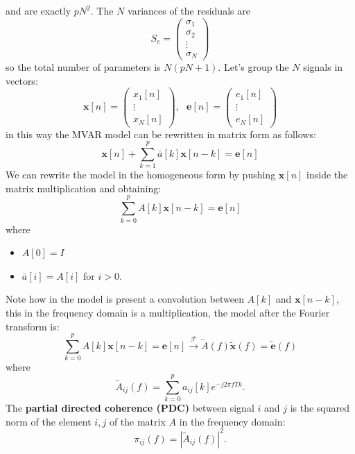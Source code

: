 \documentclass[10pt, letterpaper]{report}
\begin{document}
and are exactly $pN^2$. The $N$ variances of the residuals are\begin{equation}
     S_e=\begin{pmatrix}
          \sigma_1\\ \sigma_2\\\vdots \\ \sigma_N
     \end{pmatrix}
\end{equation}
so the total number of parameters is $N(pN+1)$. Let's group the $N$ signals in vectors:\begin{equation}
     \mathbf x[n]=\begin{pmatrix}
          x_1[n]\\ \vdots \\ x_N[n]
     \end{pmatrix}, \ \ \ \mathbf e[n]=\begin{pmatrix}
          e_1[n]\\ \vdots \\ e_N[n]
     \end{pmatrix}
\end{equation}
in this way the MVAR model can be rewritten in matrix form as follows:\begin{equation}
     \mathbf x[n]+\sum_{k=1}^p\bar a[k]\mathbf x[n-k]=\mathbf e[n]
\end{equation}
We can rewrite the model in the homogeneous form by pushing $\mathbf x[n]$ inside the matrix multiplication and obtaining:\begin{equation}
    \sum_{k=0}^pA[k]\mathbf x[n-k]=\mathbf e[n]
\end{equation}
where \begin{itemize}
     \item $A[0]=I$
     \item $\bar a[i]=A[i]$ for $i>0$.
\end{itemize}
Note how in the model is present a convolution between $A[k]$ and $\mathbf x[n-k]$, this in the frequency domain is a multiplication, the model after the Fourier transform is:\begin{equation}
     \sum_{k=0}^pA[k]\mathbf x[n-k]=\mathbf e[n] \xrightarrow{\mathcal F}\tilde A(f)\tilde {\mathbf x}(f)=\tilde{\mathbf e}(f)
\end{equation}
where\begin{equation}
     \tilde A_{ij}(f)=\sum_{k=0}^p a_{ij}[k]e^{-j2\pi fT k}.
\end{equation}
The \textbf{partial directed coherence (PDC)} between signal $i$ and $j$ is the squared norm of the element $i,j$ of the matrix $A$ in the frequency domain:\begin{equation}
     \pi_{ij}(f)=|\tilde A_{ij}(f)|^2.
\end{equation}
\end{document}
